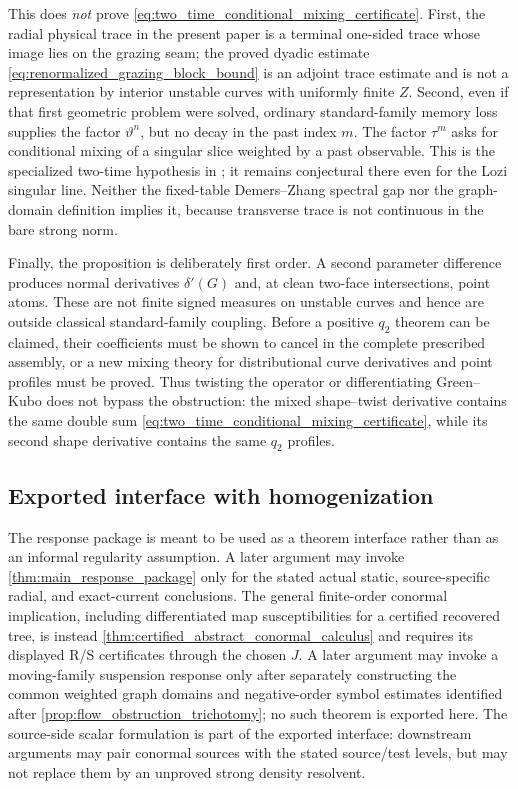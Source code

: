 \documentclass[11pt]{amsart}
\theoremstyle{compactplain}
\theoremstyle{compactdefinition}
\theoremstyle{compactremark}
\begin{document}
This does \emph{not} prove
\eqref{eq:two_time_conditional_mixing_certificate}.  First, the radial
physical trace in the present paper is a terminal one-sided trace whose image
lies on the grazing seam; the proved dyadic estimate
\eqref{eq:renormalized_grazing_block_bound} is an adjoint trace estimate and
is not a representation by interior unstable curves with uniformly finite
\(Z\).  Second, even if that first geometric problem were solved, ordinary
standard-family memory loss supplies the factor \(\vartheta^n\), but no decay
in the past index \(m\).  The factor \(\tau^m\) asks for conditional mixing
of a singular slice weighted by a past observable.  This is the specialized
two-time hypothesis in
\cite{Wormell2024PiecewiseResponse}; it remains conjectural there even for
the Lozi singular line.  Neither the fixed-table Demers--Zhang spectral gap
nor the graph-domain definition implies it, because transverse trace is not
continuous in the bare strong norm.

Finally, the proposition is deliberately first order.  A second parameter
difference produces normal derivatives \(\delta'(G)\) and, at clean
two-face intersections, point atoms.  These are not finite signed measures on
unstable curves and hence are outside classical standard-family coupling.
Before a positive \(q_2\) theorem can be claimed, their coefficients must be
shown to cancel in the complete prescribed assembly, or a new mixing theory
for distributional curve derivatives and point profiles must be proved.
Thus twisting the operator or differentiating Green--Kubo does not bypass the
obstruction: the mixed shape--twist derivative contains the same double sum
\eqref{eq:two_time_conditional_mixing_certificate}, while its second shape
derivative contains the same \(q_2\) profiles.

\subsection{Exported interface with homogenization}
\label{sec:exported_interface}

The response package is meant to be used as a theorem interface rather than as
an informal regularity assumption.  A later argument may invoke
\cref{thm:main_response_package} only for the stated actual static,
source-specific radial, and exact-current conclusions.  The general
finite-order conormal implication, including differentiated map
susceptibilities for a certified recovered tree, is instead
\cref{thm:certified_abstract_conormal_calculus} and requires its displayed
R/S certificates through the chosen \(J\).  A later argument may
invoke a moving-family suspension response only after separately constructing
the common weighted graph domains and negative-order symbol estimates
identified after \cref{prop:flow_obstruction_trichotomy}; no such theorem is
exported here.  The
source-side scalar formulation is part
of the exported interface: downstream arguments may pair conormal sources with
the stated source/test levels, but may not replace them by an unproved
strong density resolvent.
\end{document}
